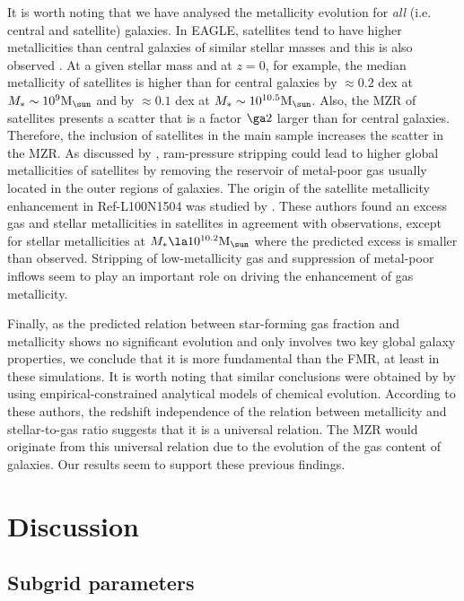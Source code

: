 \documentclass[useAMS,usenatbib]{mn2e}
\begin{document}
It is worth noting that we have analysed the metallicity evolution for {\em all} (i.e. central and satellite) 
galaxies. In {\sc EAGLE}, satellites tend to have higher metallicities than central galaxies
of similar stellar masses \citep{bahe2016} and this is also observed \citep{pasquali2010,pasquali2012}.  
At a given stellar mass and at $z=0$, for example, the median metallicity of satellites is higher
than for central galaxies by $\approx 0.2$ dex at $M_* \sim 10^9 {\rm M}_{\sun}$
and by $\approx 0.1$ dex at $M_* \sim 10^{10.5} {\rm M}_{\sun}$.  Also, the MZR of satellites presents a scatter that 
is a factor $\ga 2$ larger than for central galaxies. 
Therefore, the inclusion of satellites in the main sample increases the scatter
in the MZR. As discussed by \citet{derossi2015}, 
ram-pressure stripping could lead to higher global metallicities of satellites by removing
the reservoir of metal-poor gas usually located in the outer regions of galaxies.
The origin of the satellite metallicity enhancement in Ref-L100N1504 was studied by \citet{bahe2016}.
These authors found an excess gas and stellar metallicities
in satellites in agreement with observations, except for stellar metallicities 
at $M_* \la 10^{10.2} {\rm M}_{\sun}$ where the predicted excess is smaller than observed.
Stripping of low-metallicity gas and 
suppression of metal-poor inflows seem to play an important
role on driving the enhancement of gas metallicity.


Finally, as the predicted relation between star-forming gas fraction and metallicity shows no significant evolution 
and only involves two key global galaxy properties, 
we conclude that it is more fundamental than the FMR, at least in these simulations.
It is worth noting that similar conclusions were obtained by \citet{zahid2014a} by using 
empirical-constrained analytical models of chemical evolution. According to these authors, the
redshift independence of the relation between metallicity and stellar-to-gas ratio suggests
that it is a universal relation. The MZR would originate from this universal relation due to the
evolution of the gas content of galaxies. Our results seem to support these previous findings.


\section{Discussion}
\label{sec:models}

\subsection{Subgrid parameters}
\label{sec:eagle_models}
\end{document}

